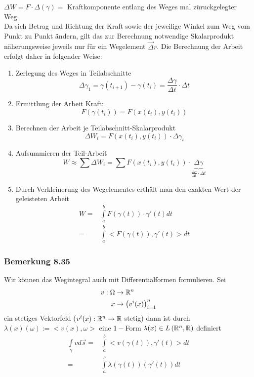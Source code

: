 $\Delta W= F\cdot \Delta (\gamma)=$ Kraftkomponente entlang des Weges mal züruckgelegter Weg. \\

Da sich Betrag und Richtung der Kraft sowie der jeweilige Winkel zum Weg vom Punkt zu Punkt ändern, gilt das zur Berechnung notwendige Skalarprodukt näherungsweise jeweils nur für ein Wegelement $\overrightarrow\Delta r$. Die Berechnung der Arbeit erfolgt daher in folgender Weise:
\begin{enumerate}[\indent a)]
\item Zerlegung des Weges in Teilabschnitte \[\Delta \gamma_1=\gamma (t_{i+1})-\gamma(t_i)=\frac{\Delta \gamma}{\Delta t}\cdot \Delta t\]
\item Ermittlung der Arbeit  Kraft: \[F\left( {\gamma \left( {{t_i}} \right)} \right) = F\left( {x\left( {{t_i}} \right),y\left( {{t_i}} \right)} \right)\]
\item Berechnen der Arbeit je Teilabschnitt-Skalarprodukt \[\Delta {W_i} = F\left( {x\left( {{t_i}} \right),y\left( {{t_i}} \right)} \right) \cdot \Delta {\gamma _i}\]
\item Aufsummieren der Teil-Arbeit \[W \approx \sum {\Delta {W_i} = \sum {F\left( {x\left( {{t_i}} \right),y\left( {{t_i}} \right)} \right)} }  \cdot \underbrace {\Delta \gamma }_{\frac{{\Delta \gamma }}{{\Delta t}} \cdot \Delta t}\]
\item Durch Verkleinerung des Wegelementes erthält man den exakten Wert der geleisteten Arbeit
\begin{align*}
W = &\int\limits_a^b {F\left( {\gamma \left( t \right)} \right)}  \cdot \gamma '\left( t \right)dt\\
 = &\int\limits_a^b { < F\left( {\gamma \left( t \right)} \right)} ,\gamma '\left( t \right) > dt
\end{align*}
\end{enumerate}
\subsubsection*{Bemerkung 8.35}
Wir können das Wegintegral auch mit Differentialformen formulieren. Sei
\begin{align*}
v:\Omega &\to\mathbb{R}^n\\
x &\to\left( v^i(x)\right)_{i=1}^n
\end{align*}
ein stetiges Vektorfeld ($v^i(x):\mathbb{R}^n\to\mathbb{R}$ stetig) dann ist durch $\lambda (x)(\omega):=< v(x),\omega >$ eine $1-$Form $\lambda (x)\in L\left( \mathbb{R}^n,\mathbb{R}\right)$ definiert
\begin{align*}
\int\limits_\gamma  {vd\vec s}  = &\int\limits_a^b { < v\left( {\gamma (t)} \right),\gamma '(t) > dt}\\
 = &\int\limits_a^b {\lambda \left( {\gamma \left( t \right)} \right)\left( {\gamma '\left( t \right)} \right)dt}
\end{align*}

